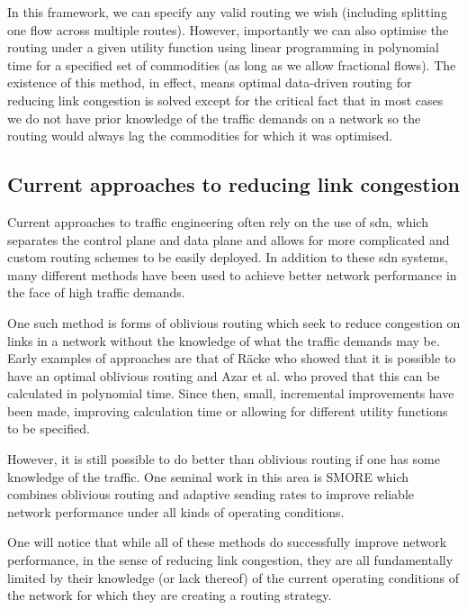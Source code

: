 In this framework, we can specify any valid routing we wish (including splitting one flow across multiple routes). However, importantly we can also optimise the routing under a given utility function using linear programming in polynomial time for a specified set of commodities (as long as we allow fractional flows)\cite{cormen2009introduction}. The existence of this method, in effect, means optimal data-driven routing for reducing link congestion is solved except for the critical fact that in most cases we do not have prior knowledge of the traffic demands on a network so the routing would always lag the commodities for which it was optimised.

\subsection{Current approaches to reducing link congestion}

Current approaches to traffic engineering often rely on the use of \ac{sdn}, which separates the control plane and data plane and allows for more complicated and custom routing schemes to be easily deployed\cite{doi:10.1002/sec.1737}. In addition to these \ac{sdn} systems, many different methods have been used to achieve better network performance in the face of high traffic demands.

One such method is forms of oblivious routing\cite{Bansal2008} which seek to reduce congestion on links in a network without the knowledge of what the traffic demands may be. Early examples of approaches are that of R\"acke\cite{racke2002minimizing} who showed that it is possible to have an optimal oblivious routing and Azar et al.\cite{azar2004optimal} who proved that this can be calculated in polynomial time. Since then, small, incremental improvements have been made, improving calculation time or allowing for different utility functions to be specified\cite{kodialam2008advances}.

However, it is still possible to do better than oblivious routing if one has some knowledge of the traffic. One seminal work in this area is SMORE\cite{kumar2018semi} which combines oblivious routing and adaptive sending rates to improve reliable network performance under all kinds of operating conditions.

One will notice that while all of these methods do successfully improve network performance, in the sense of reducing link congestion, they are all fundamentally limited by their knowledge (or lack thereof) of the current operating conditions of the network for which they are creating a routing strategy.


